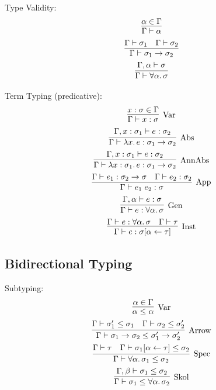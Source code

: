 Type Validity:
\begin{gather*}
  \infer{
    \Gamma \vdash \alpha
  }{
    \alpha \in \Gamma
  }
  \\
  \infer{
    \Gamma \vdash \sigma_1 \to \sigma_2
  }{
    \Gamma \vdash \sigma_1
    &
    \Gamma \vdash \sigma_2
  }
  \\
  \infer{
    \Gamma \vdash \forall \alpha\ldotp \sigma
  }{
    \Gamma, \alpha \vdash \sigma
  }
\end{gather*}

Term Typing (predicative):
\begin{gather*}
  \infer[\text{Var}]{
    \Gamma \vdash x: \sigma
  }{
    x:\sigma \in \Gamma
  }
  \\
  \infer[\text{Abs}]{
    \Gamma \vdash \lambda x\ldotp e: \sigma_1 \to \sigma_2
  }{
    \Gamma, x: \sigma_1\vdash e: \sigma_2
  }
  \\
  \infer[\text{AnnAbs}]{
    \Gamma \vdash \lambda x: \sigma_1\ldotp e: \sigma_1 \to \sigma_2
  }{
    \Gamma, x: \sigma_1\vdash e: \sigma_2
  }
  \\
  \infer[\text{App}]{
    \Gamma \vdash e_1\; e_2: \sigma
  }{
    \Gamma \vdash e_1: \sigma_2 \to \sigma
    &
    \Gamma \vdash e_2: \sigma_2
  }
  \\
  \infer[\text{Gen}]{
    \Gamma \vdash e: \forall \alpha\ldotp \sigma
  }{
    \Gamma, \alpha \vdash e: \sigma
  }
  \\
  \infer[\text{Inst}]{
    \Gamma \vdash e: \sigma[\alpha \assign \tau]
  }{
    \Gamma \vdash e: \forall \alpha\ldotp \sigma
    &
    \Gamma \vdash \tau
  }
\end{gather*}

\subsection{Bidirectional Typing}

Subtyping:
\begin{gather*}
  \infer[\text{Var}]{
    \alpha \leq \alpha
  }{
    \alpha \in \Gamma
  }
  \\
  \infer[\text{Arrow}]{
    \Gamma \vdash \sigma_1 \to \sigma_2 \leq \sigma'_1 \to \sigma'_2
  }{
    \Gamma \vdash \sigma'_1 \leq \sigma_1
    &
    \Gamma \vdash \sigma_2 \leq \sigma'_2
  }
  \\
  \infer[\text{Spec}]{
    \Gamma \vdash \forall \alpha\ldotp \sigma_1 \leq \sigma_2
  }{
    \Gamma \vdash \tau
    &
    \Gamma \vdash \sigma_1[\alpha \assign \tau] \leq \sigma_2
  }
  \\
  \infer[\text{Skol}]{
    \Gamma \vdash \sigma_1 \leq \forall \alpha\ldotp \sigma_2
  }{
    \Gamma, \beta \vdash \sigma_1 \leq \sigma_2
  }
\end{gather*}

